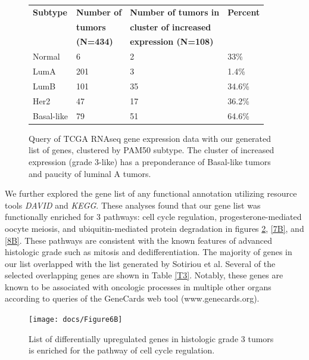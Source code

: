 \documentclass[a4paper,10pt]{article}
\begin{document}
 \begin{figure}
\begin{tabular}{| l | l | l | l | }
    \hline
\textbf{Subtype} & \textbf{Number of} & \textbf{Number of tumors in } & \textbf{Percent}\\  
 &   \textbf{tumors}  & \textbf{cluster of increased} & \\
 &  \textbf{ (N=434)} & \textbf{expression (N=108)} & \\
\hline
Normal & 6 & 2 & 33\% \\ \hline 
 LumA & 201 & 3 & 1.4\% \\ \hline 
 LumB & 101 & 35 & 34.6\% \\ \hline 
 Her2 & 47 & 17 & 36.2\% \\ \hline 
 Basal-like & 79 & 51 & 64.6\% \\ \hline 
\end{tabular}
\caption{Query of TCGA RNAseq gene expression data with our generated list of genes,
 clustered by PAM50 subtype.  The cluster of increased expression (grade 3-like) has a preponderance 
of Basal-like tumors and paucity of luminal A tumors.}\label{T2}
\end{figure}

We further explored the gene list of any functional annotation utilizing resource tools 
\emph{DAVID} and \emph{KEGG}\cite{Huang1}\cite{Kanehisa1}\cite{Kanehisa2}\cite{Ogata1}.  These analyses found that our gene list 
was functionally enriched for 3 pathways: cell cycle regulation, progesterone-mediated 
oocyte meiosis, and ubiquitin-mediated protein degradation in figures \ref{6B}, \ref{7B}, and \ref{8B}. 
 These pathways are consistent with the known features of advanced histologic 
grade such as mitosis and dedifferentiation.  The majority of genes in our list
 overlapped with the list generated by Sotiriou et al. Several of the selected 
overlapping genes are shown in Table \ref{T3}.  Notably, these genes are known to 
be associated with oncologic processes in multiple other organs according to 
queries of the GeneCards web tool (www.genecards.org).  


\begin{figure}
\centering
\texttt{[image: docs/Figure6B]}
\caption{List of differentially upregulated genes in histologic 
grade 3 tumors is enriched for the pathway of cell cycle regulation.}\label{6B}
\end{figure}
\end{document}

